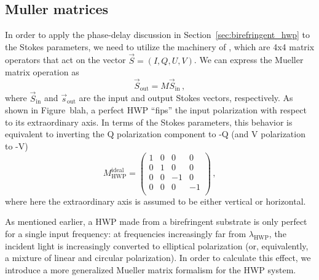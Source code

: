 
\subsection{Muller matrices}
\label{sec:muller_matrix_formalism}

In order to apply the phase-delay discussion in Section~\ref{sec:birefringent_hwp} to the Stokes parameters, we need to utilize the machinery of , which are 4x4 matrix operators that act on the  vector $\vec{S} = (I, Q, U, V)$. We can express the Mueller matrix operation as
\begin{equation}
    \vec{S}_{\mathrm{out}} = M \vec{S}_{\mathrm{in}} \, ,
    \label{eq:mueller_matrix_operation}
\end{equation}
where $\vec{S}_{\mathrm{in}}$ and $\vec{s}_{\mathrm{out}}$ are the input and output Stokes vectors, respectively. As shown in Figure~blah, a perfect HWP ``fips'' the input polarization with respect to its extraordinary axis. In terms of the Stokes parameters, this behavior is equivalent to inverting the Q polarization component to -Q (and V polarization to -V)
\begin{equation}
    M_{\mathrm{HWP}}^{\mathrm{ideal}}
    =
    \begin{pmatrix}
    1 & 0 & 0 & 0 \\
    0 & 1 & 0 & 0 \\
    0 & 0 & -1 & 0 \\
    0 & 0 & 0 & -1 \\
    \end{pmatrix} \, ,
    \label{eq:mueller_matrix_ideal_hwp}
\end{equation}
where here the extraordinary axis is assumed to be either vertical or horizontal. 

As mentioned earlier, a HWP made from a birefringent substrate is only perfect for a single input frequency: at frequencies increasingly far from $\lambda_{\mathrm{HWP}}$, the incident light is increasingly converted to elliptical polarization (or, equivalently, a mixture of linear and circular polarization). In order to calculate this effect, we introduce a more generalized Mueller matrix formalism for the HWP system. 

